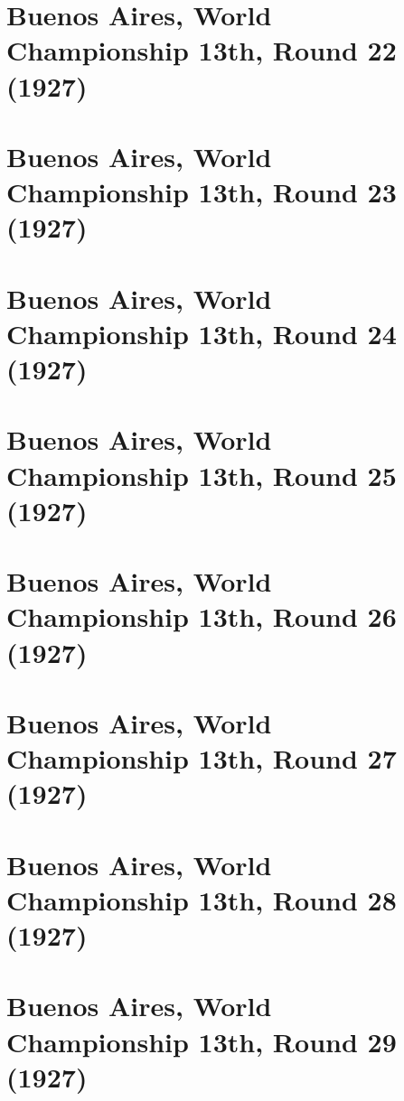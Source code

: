 \documentclass[11pt]{article}
\begin{document}
\clearpage

\section{Buenos Aires, World Championship 13th, Round 22 (1927)}


\clearpage

\section{Buenos Aires, World Championship 13th, Round 23 (1927)}


\clearpage

\section{Buenos Aires, World Championship 13th, Round 24 (1927)}


\clearpage

\section{Buenos Aires, World Championship 13th, Round 25 (1927)}


\clearpage

\section{Buenos Aires, World Championship 13th, Round 26 (1927)}


\clearpage

\section{Buenos Aires, World Championship 13th, Round 27 (1927)}


\clearpage

\section{Buenos Aires, World Championship 13th, Round 28 (1927)}


\clearpage

\section{Buenos Aires, World Championship 13th, Round 29 (1927)}

\end{document}
